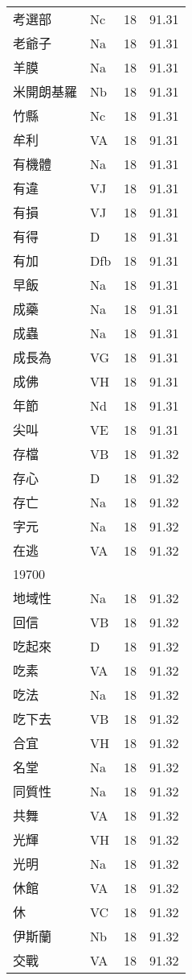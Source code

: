 \documentclass[twocolumn]{book}
\begin{document}
\begin{supertabular}{llrr}
考選部 & Nc & 18 &  91.31\\
老爺子 & Na & 18 &  91.31\\
羊膜 & Na & 18 &  91.31\\
米開朗基羅 & Nb & 18 &  91.31\\
竹縣 & Nc & 18 &  91.31\\
牟利 & VA & 18 &  91.31\\
有機體 & Na & 18 &  91.31\\
有違 & VJ & 18 &  91.31\\
有損 & VJ & 18 &  91.31\\
有得 & D & 18 &  91.31\\
有加 & Dfb & 18 &  91.31\\
早飯 & Na & 18 &  91.31\\
成藥 & Na & 18 &  91.31\\
成蟲 & Na & 18 &  91.31\\
成長為 & VG & 18 &  91.31\\
成佛 & VH & 18 &  91.31\\
年節 & Nd & 18 &  91.31\\
尖叫 & VE & 18 &  91.31\\
存檔 & VB & 18 &  91.32\\
存心 & D & 18 &  91.32\\
存亡 & Na & 18 &  91.32\\
字元 & Na & 18 &  91.32\\
在逃 & VA & 18 &  91.32\\
19700\\
地域性 & Na & 18 &  91.32\\
回信 & VB & 18 &  91.32\\
吃起來 & D & 18 &  91.32\\
吃素 & VA & 18 &  91.32\\
吃法 & Na & 18 &  91.32\\
吃下去 & VB & 18 &  91.32\\
合宜 & VH & 18 &  91.32\\
名堂 & Na & 18 &  91.32\\
同質性 & Na & 18 &  91.32\\
共舞 & VA & 18 &  91.32\\
光輝 & VH & 18 &  91.32\\
光明 & Na & 18 &  91.32\\
休館 & VA & 18 &  91.32\\
休 & VC & 18 &  91.32\\
伊斯蘭 & Nb & 18 &  91.32\\
交戰 & VA & 18 &  91.32\\

\end{supertabular}
\end{document}
